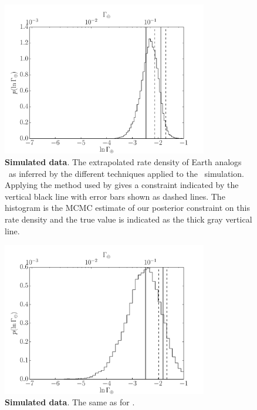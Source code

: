 \begin{figure}[p]
\begin{center}
\includegraphics[width=0.8\textwidth]{figures/exopop/smooth/rate.pdf}
\end{center}
\caption[The inferred rate of Earth analogs for the simulated catalog \modela]{%
{\bf Simulated data}.
The extrapolated rate density of Earth analogs \gammaearth\ as inferred by the
different techniques applied to the \modela\ simulation.
Applying the method used by \citet{Petigura:2013} gives a constraint indicated by
the vertical black line with error bars shown as dashed lines.
The histogram is the MCMC estimate of our posterior constraint on this rate
density and the true value is indicated as the thick gray vertical line.
}
\end{figure}

\begin{figure}[p]
\begin{center}
\includegraphics[width=0.8\textwidth]{figures/exopop/simulation/rate.pdf}
\end{center}
\caption[The inferred rate of Earth analogs for the simulated catalog \modelb]{%
{\bf Simulated data}.
The same as  for \modelb.
}
\end{figure}

